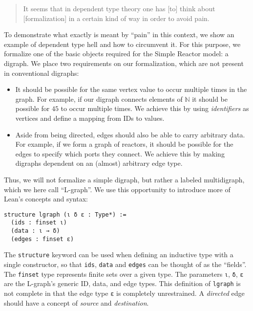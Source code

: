 \begin{quote}
It seems that in dependent type theory one has [to] think about [formalization] in a certain kind of way in order to avoid pain.\hfill \cite{pain}
\end{quote}

\noindent To demonstrate what exactly is meant by ``pain'' in this context, we show an example of dependent type hell and how to circumvent it.
For this purpose, we formalize one of the basic objects required for the Simple Reactor model: a digraph.
We place two requirements on our formalization, which are not present in conventional digraphs:

\begin{itemize}
  \item It should be possible for the same vertex value to occur multiple times in the graph. 
  For example, if our digraph connects elements of $\mathbb{N}$ it should be possible for $45$ to occur multiple times.
  We achieve this by using \emph{identifiers} as vertices and define a mapping from IDs to values.
  \item Aside from being directed, edges should also be able to carry arbitrary data.
  For example, if we form a graph of reactors, it should be possible for the edges to specify which ports they connect.
  We achieve this by making digraphs dependent on an (almost) arbitrary edge type.
\end{itemize}

\noindent Thus, we will not formalize a simple digraph, but rather a labeled multidigraph, which we here call ``L-graph''.
We use this opportunity to introduce more of Lean's concepts and syntax:

\begin{lstlisting}
structure lgraph (ι δ ε : Type*) :=
  (ids : finset ι)
  (data : ι → δ)
  (edges : finset ε)
\end{lstlisting}

\noindent The \verb|structure| keyword can be used when defining an inductive type with a single constructor, so that \lstinline{ids}, \lstinline{data} and \lstinline{edges} can be thought of as the ``fields''.
The \lstinline{finset} type represents finite sets over a given type.
The parameters \lstinline{ι}, \lstinline{δ}, \lstinline{ε} are the L-graph's generic ID, data, and edge types.
This definition of \lstinline{lgraph} is not complete in that the edge type \lstinline{ε} is completely unrestrained.
A \emph{directed} edge should have a concept of \emph{source} and \emph{destination}.

